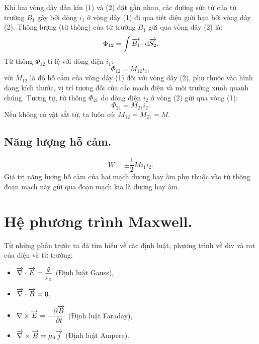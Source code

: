 \begin{appendices}
\begin{center}
\begin{tikzpicture}[x=0.7pt,y=0.7pt,yscale=-0.9,xscale=0.9]
\end{tikzpicture}

    \end{center}
    Khi hai vòng dây dẫn kín (1) và (2) đặt gần nhau, các đường sức từ của từ trường $B_1$ gây bởi dòng $i_1$ ở vòng dây (1) đi qua tiết diện giới hạn bởi vòng dây (2). Thông lượng (từ thông) của từ trường $B_1$ gửi qua vòng dây (2) là:
    $$\Phi_{12}=\int \ot{B_1}\cdot \dd\ot{S_2}.$$
    Từ thông $\Phi_{12}$ tỉ lệ với dòng điện $i_1$:
    $$\Phi_{12}=M_{12}i_1,$$
    với $M_{12}$ là độ hỗ cảm của vòng dây (1) đối với vòng dây (2), phụ thuộc vào hình dạng kích thước, vị trí tương đối của các mạch điện và môi trường xunh quanh chúng.
    Tương tự, từ thông $\Phi_{21}$ do dòng điện $i_2$ ở vòng (2) gửi qua vòng (1):
    $$\Phi_{21}=M_{21}i_2.$$
    Nếu không có vật sắt từ, ta luôn có: $M_{12}=M_{21}=M.$
\subsection{Năng lượng hỗ cảm.}
    $$W=\pm \dfrac{1}{2}Mi_1i_2.$$
    Giá trị năng lượng hỗ cảm của hai mạch dương hay âm phụ thuộc vào từ thông đoạn mạch này gửi qua đoạn mạch kia là dương hay âm.
\section{Hệ phương trình Maxwell.}
 Từ những phần trước ta đã tìm hiểu về các định luật, phương trình về div và rot của điện và từ trường:
 \begin{itemize}
 	\item $\ot{\nabla}\cdot\ot{E}=\dfrac{\varrho}{\varepsilon_0} $ (Định luật Gauss),
 	\item $\ot{\nabla}\cdot\ot{B}=0$,
 	\item $\nabla \times \ot{E}= - \dfrac{\partial \ot{B}}{\partial t}$ (Định luật Faraday),
 	\item $\ot{\nabla}\times\ot{B}= \mu_0\ot{j}$ (Định luật Ampere).
 \end{itemize}

\end{appendices}
